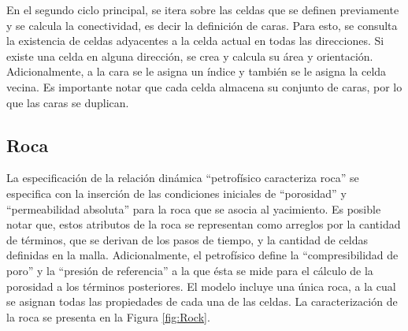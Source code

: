 En el segundo ciclo principal, se itera sobre las celdas que se definen previamente y se calcula la conectividad, es decir la definición de caras. Para esto, se consulta la existencia de celdas adyacentes a la celda actual en todas las direcciones. Si existe una celda en alguna dirección, se crea y calcula su área y orientación. Adicionalmente, a la cara se le asigna un índice y también se le asigna la celda vecina. Es importante notar que cada celda almacena su conjunto de caras, por lo que las caras se duplican.


\subsection{Roca}\label{subsec:PS_Rock}

La especificación de la relación dinámica ``petrofísico caracteriza roca'' se especifica con la inserción de las condiciones iniciales de ``porosidad'' y ``permeabilidad absoluta'' para la roca que se asocia al yacimiento. Es posible notar que, estos atributos de la roca se representan como arreglos por la cantidad de términos, que se derivan de los pasos de tiempo, y la cantidad de celdas definidas en la malla. Adicionalmente, el petrofísico define la ``compresibilidad de poro'' y la ``presión de referencia'' a la que ésta se mide para el cálculo de la porosidad a los términos posteriores. El modelo incluye una única roca, a la cual se asignan todas las propiedades de cada una de las celdas. La caracterización de la roca se presenta en la Figura \ref{fig:Rock}.\\

